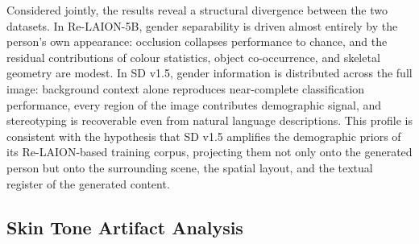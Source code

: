 Considered jointly, the results reveal a structural divergence between the two datasets.
In Re-LAION-5B, gender separability is driven almost entirely by the person's own
appearance: occlusion collapses performance to chance, and the residual contributions
of colour statistics, object co-occurrence, and skeletal geometry are modest. In SD v1.5,
gender information is distributed across the full image: background context alone
reproduces near-complete classification performance, every region of the image contributes
demographic signal, and stereotyping is recoverable even from natural language
descriptions. This profile is consistent with the hypothesis that SD v1.5 amplifies the
demographic priors of its Re-LAION-based training corpus, projecting them not only onto
the generated person but onto the surrounding scene, the spatial layout, and the textual
register of the generated content.

\subsection{Skin Tone Artifact Analysis}

